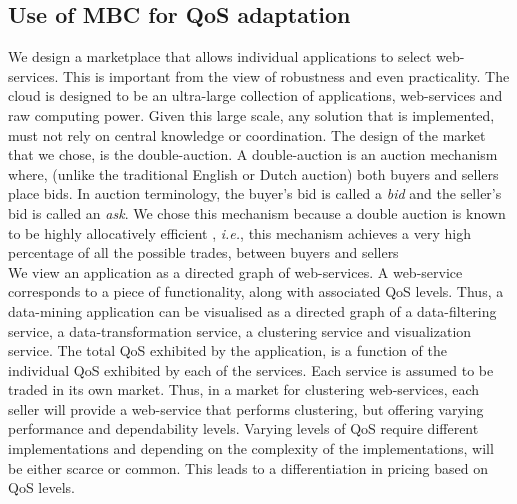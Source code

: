 \documentclass[10pt,journal,compsoc]{IEEEtran}
\begin{document}
\subsection{Use of MBC for QoS adaptation}
We design a marketplace that allows individual applications to select web-services. This is important from the view of robustness and even practicality. The cloud is designed to be an ultra-large collection of applications, web-services and raw computing power. Given this large scale, any solution that is implemented, must not rely on central knowledge or coordination. The design of the market that we chose, is the double-auction. A double-auction is an auction mechanism where, (unlike the traditional English or Dutch auction) both buyers and sellers place bids. In auction terminology, the buyer's bid is called a \textit{bid} and the seller's bid is called an \textit{ask}. We chose this mechanism because a double auction is known to be highly allocatively efficient \cite{Gode1993Allocative}, \textit{i.e.}, this mechanism achieves a very high percentage of all the possible trades, between buyers and sellers 
\\
We view an application as a directed graph of web-services. A web-service corresponds to a piece of functionality, along with associated QoS levels. Thus, a data-mining application can be visualised as a directed graph of a data-filtering service, a data-transformation service, a clustering service and visualization service. The total QoS exhibited by the application, is a function of the individual QoS exhibited by each of the services. Each service is assumed to be traded in its own market. 
Thus, in a market for clustering web-services, each seller will provide a web-service that performs clustering, but offering varying performance and dependability levels. Varying levels of QoS require different implementations and depending on the complexity of the implementations, will be either scarce or common. This leads to a differentiation in pricing based on QoS levels. 
  
\end{document}
